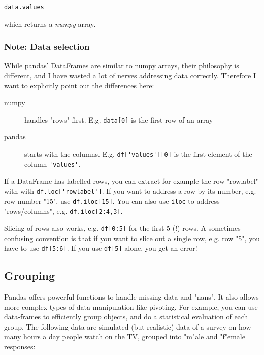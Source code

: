 \begin{lstlisting}[language=Python]
    data.values
\end{lstlisting}

which returns a \emph{numpy} array.

\subsubsection{Note: Data selection}

While pandas' DataFrames are similar to numpy arrays, their philosophy is different, and I have wasted a lot of nerves addressing data correctly. Therefore I want to explicitly point out the differences here:

\begin{description}
  \item[numpy] handles "rows" first. E.g. \lstinline{data[0]} is the first row of an array
  \item[pandas] starts with the columns. E.g. \lstinline{df['values'][0]} is the first element of the column \lstinline{'values'}.
\end{description}

If a DataFrame has labelled rows, you can extract for example the row "rowlabel" with with \lstinline{df.loc['rowlabel']}. If you want to address a row by its number, e.g. row number "15", use \lstinline{df.iloc[15]}. You can also use \lstinline{iloc} to address "rows/columns", e.g. \lstinline{df.iloc[2:4,3]}.

Slicing of rows also works, e.g. \lstinline{df[0:5]} for the first 5 (!) rows. A sometimes confusing convention is that if you want to slice out a single row, e.g. row "5", you have to use \lstinline{df[5:6]}. If you use \lstinline{df[5]} alone, you get an error!

\subsection{Grouping}

Pandas offers powerful functions to handle missing data and "nans". It also allows more complex types of data manipulation like pivoting.
For example, you can use data-frames to efficiently group objects, and do a statistical evaluation of each group. The following data are simulated (but realistic) data of a survey on how many hours a day people watch on the TV, grouped into "m"ale and "f"emale responses:

